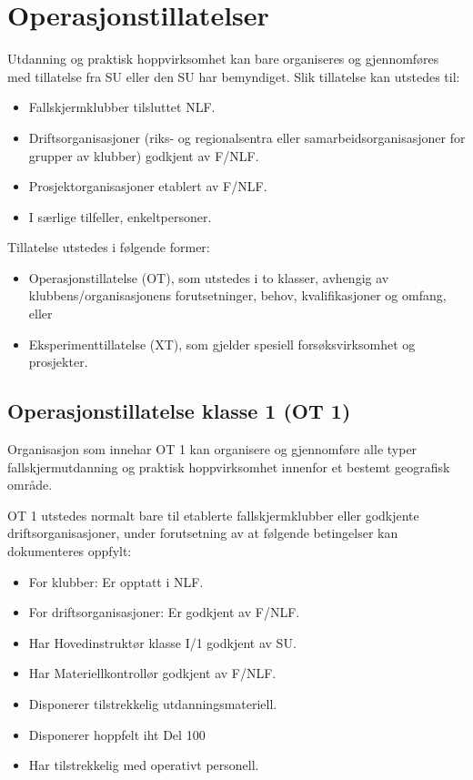 \section{Operasjonstillatelser}
Utdanning og praktisk hoppvirksomhet kan bare organiseres og gjennomføres med tillatelse fra SU eller den SU har bemyndiget. Slik tillatelse kan utstedes til:
\begin{itemize}
	\item Fallskjermklubber tilsluttet NLF.
	\item Driftsorganisasjoner (riks- og regionalsentra eller samarbeidsorganisasjoner for grupper av klubber) godkjent av F/NLF.
	\item Prosjektorganisasjoner etablert av F/NLF.
	\item I særlige tilfeller, enkeltpersoner.
\end{itemize}

Tillatelse utstedes i følgende former:
\begin{itemize}	
	\item Operasjonstillatelse (OT), som utstedes i to klasser, avhengig av klubbens/organisasjonens forutsetninger, behov, kvalifikasjoner og omfang, eller
	\item Eksperimenttillatelse (XT), som gjelder spesiell forsøksvirksomhet og prosjekter.
\end{itemize}

\subsection{Operasjonstillatelse klasse 1 (OT 1)}
Organisasjon som innehar OT 1 kan organisere og gjennomføre alle typer fallskjermutdanning og praktisk hoppvirksomhet innenfor et bestemt geografisk område.

OT 1 utstedes normalt bare til etablerte fallskjermklubber eller godkjente driftsorganisasjoner, under forutsetning av at følgende betingelser kan dokumenteres oppfylt:
\begin{itemize}	
	\item For klubber: Er opptatt i NLF.
	\item For driftsorganisasjoner: Er godkjent av F/NLF.
	\item Har Hovedinstruktør klasse I/1 godkjent av SU.
	\item Har Materiellkontrollør godkjent av F/NLF.
	\item Disponerer tilstrekkelig utdanningsmateriell.
	\item Disponerer hoppfelt iht Del 100
	\item Har tilstrekkelig med operativt personell.
\end{itemize}

